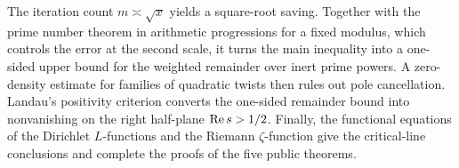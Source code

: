 The iteration count $m\asymp\sqrt{x}$ yields a square-root saving. Together with the prime number theorem in arithmetic progressions for a fixed modulus, which controls the error at the second scale, it turns the main inequality into a one-sided upper bound for the weighted remainder over inert prime powers. A zero-density estimate for families of quadratic twists then rules out pole cancellation. Landau's positivity criterion converts the one-sided remainder bound into nonvanishing on the right half-plane $\operatorname{Re} s>1/2$. Finally, the functional equations of the Dirichlet $L$-functions and the Riemann $\zeta$-function give the critical-line conclusions and complete the proofs of the five public theorems.

\cleardoublepage
{}
\tableofcontents
